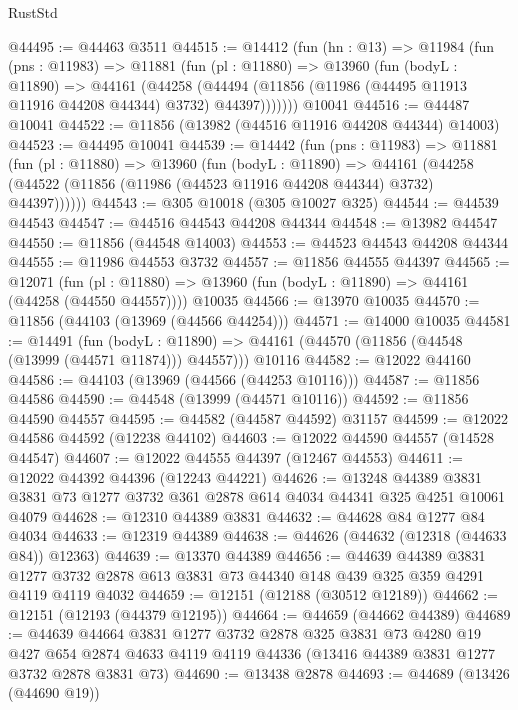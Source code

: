 \begin{lexlean}{RustStd}
\begin{coremodule}
@44495 := @44463 @3511
@44515 := @14412
    (fun (hn : @13) =>
    @11984
      (fun (pns : @11983) =>
      @11881
        (fun (pl : @11880) =>
        @13960
          (fun (bodyL : @11890) =>
          @44161
            (@44258
              (@44494 (@11856 (@11986 (@44495 @11913 @11916 @44208 @44344) @3732) @44397)))))))
    @10041
@44516 := @44487 @10041
@44522 := @11856 (@13982 (@44516 @11916 @44208 @44344) @14003)
@44523 := @44495 @10041
@44539 := @14442
    (fun (pns : @11983) =>
    @11881
      (fun (pl : @11880) =>
      @13960
        (fun (bodyL : @11890) =>
        @44161 (@44258 (@44522 (@11856 (@11986 (@44523 @11916 @44208 @44344) @3732) @44397))))))
@44543 := @305 @10018 (@305 @10027 @325)
@44544 := @44539 @44543
@44547 := @44516 @44543 @44208 @44344
@44548 := @13982 @44547
@44550 := @11856 (@44548 @14003)
@44553 := @44523 @44543 @44208 @44344
@44555 := @11986 @44553 @3732
@44557 := @11856 @44555 @44397
@44565 := @12071
    (fun (pl : @11880) => @13960 (fun (bodyL : @11890) => @44161 (@44258 (@44550 @44557))))
    @10035
@44566 := @13970 @10035
@44570 := @11856 (@44103 (@13969 (@44566 @44254)))
@44571 := @14000 @10035
@44581 := @14491
    (fun (bodyL : @11890) => @44161 (@44570 (@11856 (@44548 (@13999 (@44571 @11874))) @44557)))
    @10116
@44582 := @12022 @44160
@44586 := @44103 (@13969 (@44566 (@44253 @10116)))
@44587 := @11856 @44586
@44590 := @44548 (@13999 (@44571 @10116))
@44592 := @11856 @44590 @44557
@44595 := @44582 (@44587 @44592) @31157
@44599 := @12022 @44586 @44592 (@12238 @44102)
@44603 := @12022 @44590 @44557 (@14528 @44547)
@44607 := @12022 @44555 @44397 (@12467 @44553)
@44611 := @12022 @44392 @44396 (@12243 @44221)
@44626 := @13248
    @44389
    @3831
    @3831
    @73
    @1277
    @3732
    @361
    @2878
    @614
    @4034
    @44341
    @325
    @4251
    @10061
    @4079
@44628 := @12310 @44389 @3831
@44632 := @44628 @84 @1277 @84 @4034
@44633 := @12319 @44389
@44638 := @44626 (@44632 (@12318 (@44633 @84)) @12363)
@44639 := @13370 @44389
@44656 := @44639
    @44389
    @3831
    @1277
    @3732
    @2878
    @613
    @3831
    @73
    @44340
    @148
    @439
    @325
    @359
    @4291
    @4119
    @4119
    @4032
@44659 := @12151 (@12188 (@30512 @12189))
@44662 := @12151 (@12193 (@44379 @12195))
@44664 := @44659 (@44662 @44389)
@44689 := @44639
    @44664
    @3831
    @1277
    @3732
    @2878
    @325
    @3831
    @73
    @4280
    @19
    @427
    @654
    @2874
    @4633
    @4119
    @4119
    @44336
    (@13416 @44389 @3831 @1277 @3732 @2878 @3831 @73)
@44690 := @13438 @2878
@44693 := @44689 (@13426 (@44690 @19))

\end{coremodule}
\end{lexlean}

